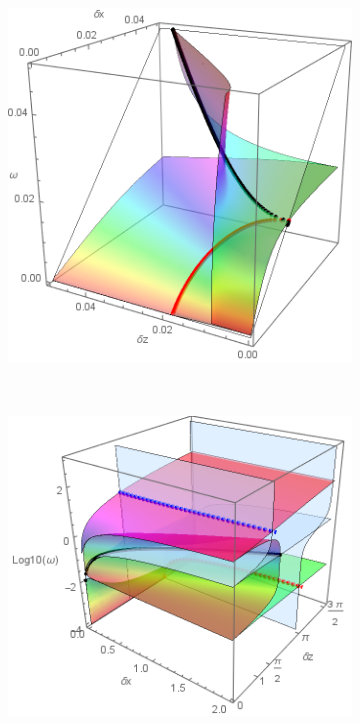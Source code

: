 \documentclass[a4paper,11pt]{article}
\begin{document}
\begin{figure}[!h]
	\begin{subfigure}{0.45\linewidth}
		\includegraphics[width=1\linewidth]{FIGURES/Fig_Inter_All_zoom4.png}
		\caption{}
	\end{subfigure}
	~
	\begin{subfigure}{0.45\linewidth}
		\includegraphics[width=1\linewidth]{FIGURES/Disp_Full_all.png}
		\caption{}
	\end{subfigure}


\end{figure}
\end{document}
